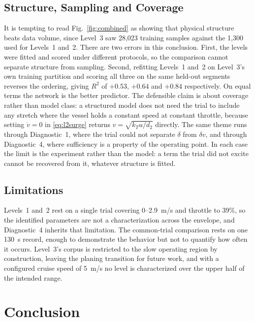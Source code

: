 \documentclass[conference]{IEEEtran}
\begin{document}
\subsection{Structure, Sampling and Coverage}

It is tempting to read Fig.~\ref{fig:combined} as showing that physical structure beats data volume, since Level~3 saw 28{,}023 training samples against the 1{,}300 used for Levels~1 and~2. There are two errors in this conclusion. First, the levels were fitted and scored under different protocols, so the comparison cannot separate structure from sampling.  Second, refitting Levels~1 and~2 on Level~3's own training partition and scoring all three on the same held-out segments reverses the ordering, giving $R^2$ of $+0.53$, $+0.64$ and $+0.84$ respectively. On equal terms the network is the better predictor. The defensible claim is about coverage rather than model class: a structured model does not need the trial to include any stretch where the vessel holds a constant speed at constant throttle, because setting $\dot v=0$ in \eqref{eq:l2surge} returns $v=\sqrt{k_T u/d_2}$ directly. The same theme runs through Diagnostic~1, where the trial could not separate $\delta$ from $\delta v$, and through Diagnostic~4, where sufficiency is a property of the operating point. 
In each case the limit is the experiment rather than the model: a term the trial did not excite cannot be recovered from it, whatever structure is fitted.

\subsection{Limitations}

Levels~1 and~2 rest on a single trial covering 0--2.9~m/s and throttle to 39\%, so the identified parameters are not a characterization across the envelope, and Diagnostic~4 inherits that limitation. The common-trial comparison rests on one 130~s record, enough to demonstrate the behavior but not to quantify how often it occurs. Level~3's corpus is restricted to the slow operating region by construction, leaving the planing transition for future work, and with a configured cruise speed of 5~m/s no level is characterized over the upper half of the intended range.

\section{Conclusion}
\label{sec:conclusion}
\end{document}
